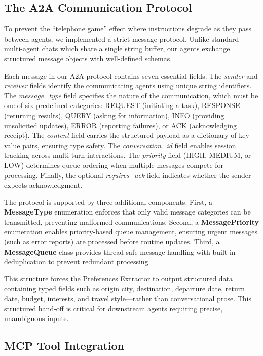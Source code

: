 \documentclass[preprint,review,12pt]{elsarticle}
\begin{document}
\subsection{The A2A Communication Protocol}

To prevent the ``telephone game'' effect where instructions degrade as they pass between agents, we implemented a strict message protocol. Unlike standard multi-agent chats which share a single string buffer, our agents exchange structured message objects with well-defined schemas.

Each message in our A2A protocol contains seven essential fields. The \textit{sender} and \textit{receiver} fields identify the communicating agents using unique string identifiers. The \textit{message\_type} field specifies the nature of the communication, which must be one of six predefined categories: REQUEST (initiating a task), RESPONSE (returning results), QUERY (asking for information), INFO (providing unsolicited updates), ERROR (reporting failures), or ACK (acknowledging receipt). The \textit{content} field carries the structured payload as a dictionary of key-value pairs, ensuring type safety. The \textit{conversation\_id} field enables session tracking across multi-turn interactions. The \textit{priority} field (HIGH, MEDIUM, or LOW) determines queue ordering when multiple messages compete for processing. Finally, the optional \textit{requires\_ack} field indicates whether the sender expects acknowledgment.

The protocol is supported by three additional components. First, a \textbf{MessageType} enumeration enforces that only valid message categories can be transmitted, preventing malformed communications. Second, a \textbf{MessagePriority} enumeration enables priority-based queue management, ensuring urgent messages (such as error reports) are processed before routine updates. Third, a \textbf{MessageQueue} class provides thread-safe message handling with built-in deduplication to prevent redundant processing.

This structure forces the Preferences Extractor to output structured data containing typed fields such as origin city, destination, departure date, return date, budget, interests, and travel style---rather than conversational prose. This structured hand-off is critical for downstream agents requiring precise, unambiguous inputs.

\subsection{MCP Tool Integration}
\end{document}

